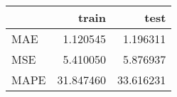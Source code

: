 \begin{tabular}{lrr}
\toprule
{} &      train &       test \\
\midrule
MAE  &   1.120545 &   1.196311 \\
MSE  &   5.410050 &   5.876937 \\
MAPE &  31.847460 &  33.616231 \\
\bottomrule
\end{tabular}
